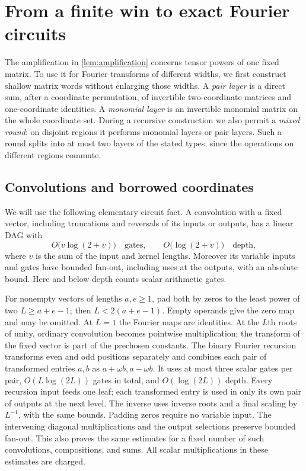 \section{From a finite win to exact Fourier circuits}
\label{fft:transfer}

The amplification in \cref{lem:amplification} concerns tensor powers of
one fixed matrix.  To use it for Fourier transforms of different widths,
we first construct shallow matrix words without enlarging those widths.
A \emph{pair layer} is a direct sum, after a coordinate permutation, of
invertible two-coordinate matrices and one-coordinate identities.  A
\emph{monomial layer} is an invertible monomial matrix on the whole
coordinate set.  During a recursive construction we also permit a
\emph{mixed round}: on disjoint regions it performs monomial layers or
pair layers.  Such a round splits into at most two layers of the stated
types, since the operations on different regions commute.

\subsection{Convolutions and borrowed coordinates}

We will use the following elementary circuit fact.  A convolution with a
fixed vector, including truncations and reversals of its inputs or
outputs, has a linear DAG with
\[
 O\bigl(v\log(2+v)\bigr)\quad\text{gates},\qquad
 O\bigl(\log(2+v)\bigr)\quad\text{depth},
\]
where $v$ is the sum of the input and kernel lengths.  Moreover its
variable inputs and gates have bounded fan-out, including uses at the
outputs, with an absolute bound.  Here and below depth counts scalar
arithmetic gates.

For nonempty vectors of lengths $a,e\ge1$, pad both by zeros to the
least power of two $L\ge a+e-1$; then $L<2(a+e-1)$.
Empty operands give the zero map and may be omitted.  At $L=1$ the
Fourier maps are identities.  At
the $L$th roots of unity, ordinary convolution becomes pointwise
multiplication; the transform of the fixed vector is part of the
prechosen constants.  The binary Fourier recursion transforms even and
odd positions separately and combines each pair of transformed entries
$a,b$ as $a+\omega b,a-\omega b$.  It uses at most three scalar gates
per pair, $O(L\log(2L))$ gates in total, and $O(\log(2L))$ depth.
Every recursion input feeds one leaf; each transformed entry is used in
only its own pair of outputs at the next level.  The inverse uses
inverse roots and a final scaling by $L^{-1}$, with the same bounds.
Padding zeros require no variable input.  The intervening diagonal
multiplications and the output selections preserve bounded fan-out.
This also proves the same estimates for a fixed number of such
convolutions, compositions, and sums.  All scalar multiplications in
these estimates are charged.

